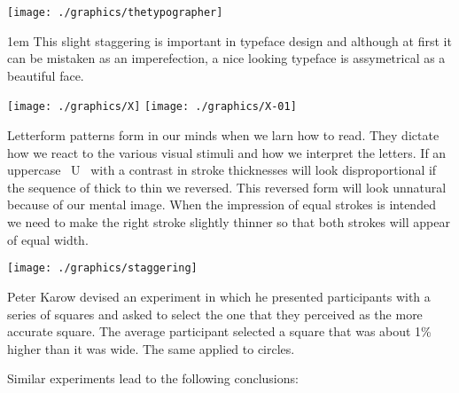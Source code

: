 \begin{multicols}{2}
 \texttt{[image: ./graphics/thetypographer]}

\parindent1em
This slight staggering is important in typeface design and although at first it can be mistaken as an imperefection, a nice looking typeface is assymetrical as a beautiful face. 

\bgroup
  \centering
  \texttt{[image: ./graphics/X]}
  \texttt{[image: ./graphics/X-01]}

  \scalebox{9}{X}
 
  \label{fig:truetype02}
\egroup

Letterform patterns form in our minds when we larn how to read. They dictate how we react to the various visual stimuli and how we interpret the letters. If an uppercase ~U~ with a contrast in stroke thicknesses will look disproportional if the sequence of thick to thin we reversed. This reversed form will look unnatural because of our mental image. When the impression of equal strokes is intended we need to make the right stroke slightly thinner so that both strokes will appear of equal width.


{
  \centering
  \texttt{[image: ./graphics/staggering]}
  \label{fig:truetype02}
}


Peter Karow devised an experiment in which he presented participants with a series of squares and asked to select the one that they perceived as the more accurate square. The average participant selected a square that was about 1\% higher than it was wide. The same applied to circles.

Similar experiments lead to the following conclusions:


\end{multicols}

